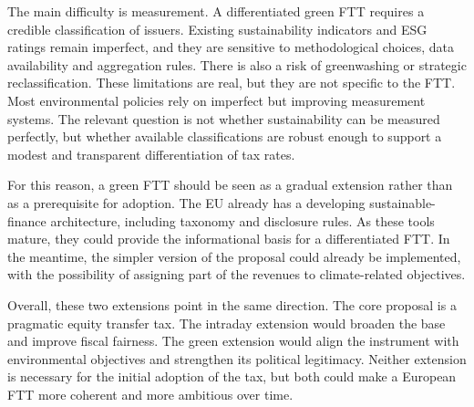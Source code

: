 \documentclass[../main]{subfiles}
\begin{document}
The main difficulty is measurement. A differentiated green FTT requires a credible classification of issuers. Existing sustainability indicators and ESG ratings remain imperfect, and they are sensitive to methodological choices, data availability and aggregation rules. There is also a risk of greenwashing or strategic reclassification. These limitations are real, but they are not specific to the FTT. Most environmental policies rely on imperfect but improving measurement systems. The relevant question is not whether sustainability can be measured perfectly, but whether available classifications are robust enough to support a modest and transparent differentiation of tax rates.

For this reason, a green FTT should be seen as a gradual extension rather than as a prerequisite for adoption. The EU already has a developing sustainable-finance architecture, including taxonomy and disclosure rules. As these tools mature, they could provide the informational basis for a differentiated FTT. In the meantime, the simpler version of the proposal could already be implemented, with the possibility of assigning part of the revenues to climate-related objectives.

Overall, these two extensions point in the same direction. The core proposal is a pragmatic equity transfer tax. The intraday extension would broaden the base and improve fiscal fairness. The green extension would align the instrument with environmental objectives and strengthen its political legitimacy. Neither extension is necessary for the initial adoption of the tax, but both could make a European FTT more coherent and more ambitious over time.




\end{document}
